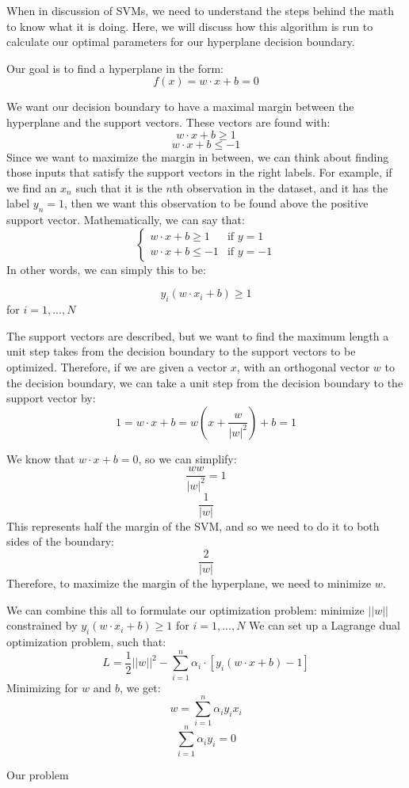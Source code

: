 \documentclass[12pt]{article}
\begin{document}
When in discussion of SVMs, we need to understand the steps behind the math to know what it is doing. Here, we will discuss how this algorithm is run to calculate our optimal parameters for our hyperplane decision boundary.

Our goal is to find a hyperplane in the form:
$$f(x) = w \cdot x + b = 0$$

We want our decision boundary to have a maximal margin between the hyperplane and the support vectors. These vectors are found with:
$$w \cdot x + b \geq 1$$
$$w \cdot x + b  \leq -1$$
Since we want to maximize the margin in between, we can think about finding those inputs that satisfy the support vectors in the right labels. For example, if we find an $x_n$ such that it is the $n$th observation in the dataset, and it has the label $y_n = 1$, then we want this observation to be found above the positive support vector. Mathematically, we can say that:
$$\begin{cases}
      w \cdot x + b \geq 1 & \text{if } y = 1 \\
      w \cdot x + b \leq -1 & \text{if } y = -1
\end{cases}$$
In other words, we can simply this to be:

$$y_i (w \cdot x_i + b) \geq 1$$ for $i = 1,...,N$

The support vectors are described, but we want to find the maximum length a unit step takes from the decision boundary to the support vectors to be optimized. Therefore, if we are given a vector $x$, with an orthogonal vector $w$ to the decision boundary, we can take a unit step from the decision boundary to the support vector by:
$$1 = w \cdot x + b = w(x + \frac{w}{|w|^2}) + b = 1$$

We know that $w \cdot x + b = 0$, so we can simplify:
$$\frac{ww}{|w|^2} = 1$$
$$\frac{1}{|w|}$$
This represents half the margin of the SVM, and so we need to do it to both sides of the boundary:
$$\frac{2}{|w|}$$
Therefore, to maximize the margin of the hyperplane, we need to minimize $w$.

We can combine this all to formulate our optimization problem: minimize $||w||$ constrained by $y_i (w \cdot x_i + b) \geq 1$ for $i = 1,...,N$
We can set up a Lagrange dual optimization problem, such that:
$$L = \frac{1}{2}||w||^2 - \sum_{i=1}^{n} \alpha_i \cdot [y_i(w \cdot x + b) - 1]$$
Minimizing for $w$ and $b$, we get:
$$w = \sum_{i=1}^{n} \alpha_i y_i x_i$$
$$\sum_{i=1}^{n} \alpha_i y_i = 0$$

Our problem 
\end{document}
